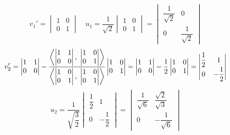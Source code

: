 \documentclass[12pt]{article}
\begin{document}
\[v_{1}' = \begin{vmatrix} 1&0 \\ 0&1 \end{vmatrix} \quad u_{1} = \dfrac{1}{\sqrt{2}} \begin{vmatrix} 1&0 \\ 0&1 \end{vmatrix} = \begin{vmatrix} \dfrac{1}{\sqrt{2}}&0 \\ 0&\dfrac{1}{\sqrt{2}} \end{vmatrix}\]
\[v_{2}' = \begin{vmatrix} 1&1 \\ 0&0 \end{vmatrix} - \dfrac{\left\langle\begin{vmatrix} 1&1 \\ 0&0 \end{vmatrix},\;\begin{vmatrix} 1&0 \\ 0&1 \end{vmatrix}\right\rangle}{\left\langle\begin{vmatrix} 1&0 \\ 0&1 \end{vmatrix},\;\begin{vmatrix} 1&0 \\ 0&1 \end{vmatrix}\right\rangle} \begin{vmatrix} 1&0 \\ 0&1 \end{vmatrix} = \begin{vmatrix} 1&1 \\ 0&0 \end{vmatrix} - \dfrac{1}{2} \begin{vmatrix} 1&0 \\ 0&1 \end{vmatrix} = \begin{vmatrix} \dfrac{1}{2}&1 \\ 0&-\dfrac{1}{2} \end{vmatrix}\]
\[u_{2} = \dfrac{1}{\sqrt{\dfrac{3}{2}}} \begin{vmatrix} \dfrac{1}{2}&1 \\ 0&-\dfrac{1}{2} \end{vmatrix} = \begin{vmatrix} \dfrac{1}{\sqrt{6}}&\dfrac{\sqrt{2}}{\sqrt{3}} \\ 0&-\dfrac{1}{\sqrt{6}} \end{vmatrix}\]
\end{document}
